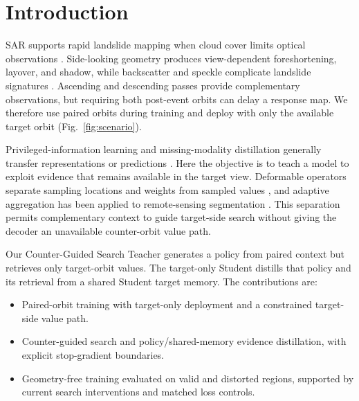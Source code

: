 \section{Introduction}
\label{sec:introduction}
SAR supports rapid landslide mapping when cloud cover limits optical observations \cite{Mondini2021,Handwerger2022,Amatya2023}. Side-looking geometry produces view-dependent foreshortening, layover, and shadow, while backscatter and speckle complicate landslide signatures \cite{Shi2024,Santangelo2022}. Ascending and descending passes provide complementary observations, but requiring both post-event orbits can delay a response map. We therefore use paired orbits during training and deploy with only the available target orbit (Fig.~\ref{fig:scenario}).

Privileged-information learning and missing-modality distillation generally transfer representations or predictions \cite{LopezPaz2016,Li2022,Liu2024}. Here the objective is to teach a model to exploit evidence that remains available in the target view. Deformable operators separate sampling locations and weights from sampled values \cite{Dai2017,Zhu2021}, and adaptive aggregation has been applied to remote-sensing segmentation \cite{Zuo2022,Dai2023}. This separation permits complementary context to guide target-side search without giving the decoder an unavailable counter-orbit value path.

Our Counter-Guided Search Teacher generates a policy from paired context but retrieves only target-orbit values. The target-only Student distills that policy and its retrieval from a shared Student target memory. The contributions are:
\begin{itemize}
\item Paired-orbit training with target-only deployment and a constrained target-side value path.
\item Counter-guided search and policy/shared-memory evidence distillation, with explicit stop-gradient boundaries.
\item Geometry-free training evaluated on valid and distorted regions, supported by current search interventions and matched loss controls.
\end{itemize}
